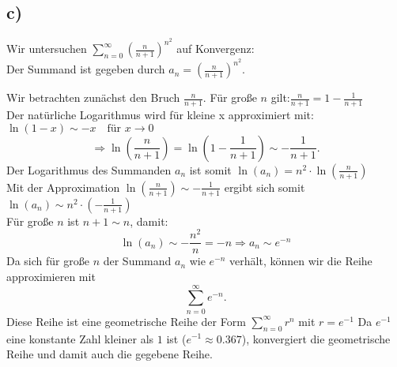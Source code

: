     \subsection{c)}
        Wir untersuchen $\sum_{n=0}^{\infty} \left( \frac{n}{n+1} \right)^{n^2}$ auf Konvergenz: \\
        Der Summand ist gegeben durch $a_n = \left( \frac{n}{n+1} \right)^{n^2}$.
        
        Wir betrachten zunächst den Bruch \( \frac{n}{n+1} \). Für große \( n \) gilt:$\frac{n}{n+1} = 1 - \frac{1}{n+1}$ \\
        Der natürliche Logarithmus wird für kleine x approximiert mit:$\ln(1-x) \sim -x \quad \text{für } x \to 0$ \\
        \[
        \Rightarrow \ln\left( \frac{n}{n+1} \right) = \ln\left( 1 - \frac{1}{n+1} \right) \sim -\frac{1}{n+1}.
        \]
        Der Logarithmus des Summanden \( a_n \) ist somit $\ln(a_n) = n^2 \cdot \ln\left( \frac{n}{n+1} \right)$ \\
        Mit der Approximation \( \ln\left( \frac{n}{n+1} \right) \sim -\frac{1}{n+1} \) ergibt sich somit $\ln(a_n) \sim n^2 \cdot \left( -\frac{1}{n+1} \right)$ \\
        Für große \( n \) ist \( n+1 \sim n \), damit:
        \[
        \ln(a_n) \sim -\frac{n^2}{n} = -n \Rightarrow a_n \sim e^{-n}
        \]
        Da sich für große \( n \) der Summand \( a_n \) wie \( e^{-n} \) verhält, können wir die Reihe approximieren mit
        \[
        \sum_{n=0}^{\infty} e^{-n}.
        \]
        Diese Reihe ist eine geometrische Reihe der Form $\sum_{n=0}^{\infty} r^n$ mit $r = e^{-1}$
        Da \( e^{-1} \) eine konstante Zahl kleiner als \( 1 \) ist (\( e^{-1} \approx 0.367 \)), konvergiert die geometrische Reihe und damit auch die gegebene Reihe.        
        
